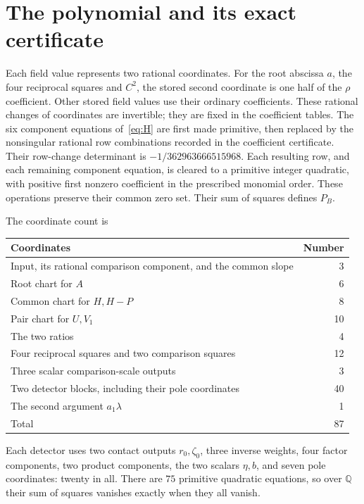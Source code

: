 \documentclass[11pt,a4paper]{article}
\newcommand{\Q}{\mathbb Q}\newcommand{\Z}{\mathbb Z}
\begin{document}
\section{The polynomial and its exact certificate}

Each field value represents two rational coordinates. For the root abscissa
$a$, the four reciprocal squares and $C^2$, the stored second
coordinate is one half of the $\rho$ coefficient. Other stored field
values use their ordinary coefficients. These rational changes of
coordinates are invertible; they are fixed in the coefficient tables.
The six component equations of~\eqref{eq:H} are first made primitive,
then replaced by the nonsingular rational row combinations recorded in
the coefficient certificate. Their row-change determinant is
$-1/362963666515968$. Each resulting row, and each remaining component
equation, is cleared to a primitive integer quadratic, with positive
first nonzero coefficient in the prescribed monomial order.
These operations preserve their common zero set. Their sum of squares
defines $P_B$.

The coordinate count is
\begin{center}
\begin{tabular}{lr}
\toprule
Coordinates & Number\\\midrule
Input, its rational comparison component, and the common slope &3\\
Root chart for $A$ &6\\
Common chart for $H,H-P$ &8\\
Pair chart for $U,V_1$ &10\\
The two ratios &4\\
Four reciprocal squares and two comparison squares &12\\
Three scalar comparison-scale outputs &3\\
Two detector blocks, including their pole coordinates &40\\
The second argument $a_1\lambda$ &1\\\midrule
Total &87\\\bottomrule
\end{tabular}
\end{center}
Each detector uses two contact outputs $r_0,\zeta_0$, three inverse
weights, four factor components, two product components, the two scalars
$\eta,b$, and seven pole coordinates: twenty in all. There are
$75$ primitive quadratic equations, so over $\Q$ their sum of squares
vanishes exactly when they all vanish.
\end{document}
